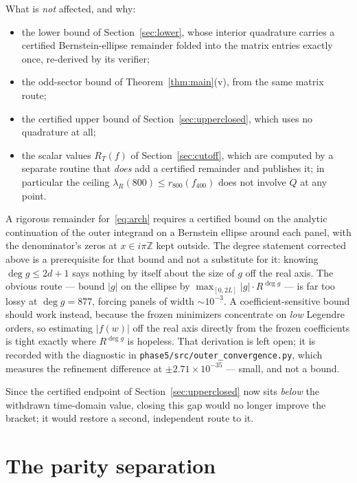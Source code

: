 \documentclass[11pt,a4paper]{article}
\theoremstyle{definition}
\theoremstyle{remark}
\newcommand{\lR}{\lambda_{R}}
\newcommand{\src}[1]{{\footnotesize\texttt{#1}}}
\begin{document}
What is \emph{not} affected, and why:
\begin{itemize}
\item the lower bound of Section~\ref{sec:lower}, whose interior quadrature
  carries a certified Bernstein-ellipse remainder folded into the matrix entries
  exactly once, re-derived by its verifier;
\item the odd-sector bound of Theorem~\ref{thm:main}(v), from the same matrix route;
\item the certified upper bound of Section~\ref{sec:upperclosed}, which uses no
  quadrature at all;
\item the scalar values $R_T(f)$ of Section~\ref{sec:cutoff}, which are computed
  by a separate routine that \emph{does} add a certified remainder and publishes
  it; in particular the ceiling $\lR(800) \le r_{800}(f_{400})$ does not involve
  $Q$ at any point.
\end{itemize}

A rigorous remainder for~\eqref{eq:arch} requires a certified bound on the
analytic continuation of the outer integrand on a Bernstein ellipse around each
panel, with the denominator's zeros at $x \in i\pi\mathbb{Z}$ kept outside. The
degree statement corrected above is a prerequisite for that bound and not a
substitute for it: knowing $\deg g \le 2d+1$ says nothing by itself about the
size of $g$ off the real axis. The obvious route --- bound $|g|$ on the ellipse
by $\max_{[0,2L]}|g| \cdot R^{\deg g}$ --- is far too lossy at $\deg g = 877$,
forcing panels of width $\sim10^{-3}$. A coefficient-sensitive bound should
work instead, because the frozen minimizers concentrate on \emph{low} Legendre
orders, so estimating $|f(w)|$ off the real axis directly from the frozen
coefficients is tight exactly where $R^{\deg g}$ is hopeless. That derivation is
left open; it is recorded with the diagnostic in
\src{phase5/src/outer\_convergence.py}, which measures the refinement difference
at $\pm 2.71\times10^{-35}$ --- small, and not a bound.

Since the certified endpoint of Section~\ref{sec:upperclosed} now sits
\emph{below} the withdrawn time-domain value, closing this gap would no longer
improve the bracket; it would restore a second, independent route to it.

\section{The parity separation}
\label{sec:parity}
\end{document}
